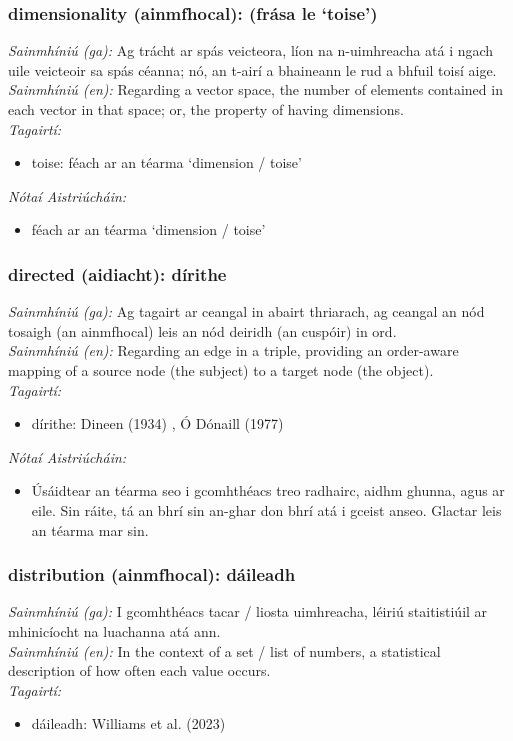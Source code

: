 \subsubsection*{dimensionality (ainmfhocal): (frása le `toise')}
 \noindent \textit{Sainmhíniú (ga):} Ag trácht ar spás veicteora, líon na n-uimhreacha atá i ngach uile veicteoir sa spás céanna; nó, an t-airí a bhaineann le rud a bhfuil toisí aige.
\\
 \noindent \textit{Sainmhíniú (en):} Regarding a vector space, the number of elements contained in each vector in that space; or, the property of having dimensions.
\\
 \noindent \textit{Tagairtí:}
\begin{itemize}
	\item toise: féach ar an téarma `dimension / toise'
\end{itemize}

 \noindent \textit{Nótaí Aistriúcháin:}
\begin{itemize}
	\item féach ar an téarma `dimension / toise'
\end{itemize}


\subsubsection*{directed (aidiacht): dírithe}
 \noindent \textit{Sainmhíniú (ga):} Ag tagairt ar ceangal in abairt thriarach, ag ceangal an nód tosaigh (an ainmfhocal) leis an nód deiridh (an cuspóir) in ord.
\\
 \noindent \textit{Sainmhíniú (en):} Regarding an edge in a triple, providing an order-aware mapping of a source node (the subject) to a target node (the object).
\\
 \noindent \textit{Tagairtí:}
\begin{itemize}
	\item dírithe: Dineen (1934) \cite{dineen}, Ó Dónaill (1977) \cite{odonaill}
\end{itemize}

 \noindent \textit{Nótaí Aistriúcháin:}
\begin{itemize}
	\item Úsáidtear an téarma seo i gcomhthéacs treo radhairc, aidhm ghunna, agus ar eile. Sin ráite, tá an bhrí sin an-ghar don bhrí atá i gceist anseo. Glactar leis an téarma mar sin.
\end{itemize}


\subsubsection*{distribution (ainmfhocal): dáileadh}
 \noindent \textit{Sainmhíniú (ga):} I gcomhthéacs tacar / liosta uimhreacha, léiriú staitistiúil ar mhinicíocht na luachanna atá ann.
\\
 \noindent \textit{Sainmhíniú (en):} In the context of a set / list of numbers, a statistical description of how often each value occurs.
\\
 \noindent \textit{Tagairtí:}
\begin{itemize}
	\item dáileadh: Williams et al. (2023) \cite{storchiste}
\end{itemize}

